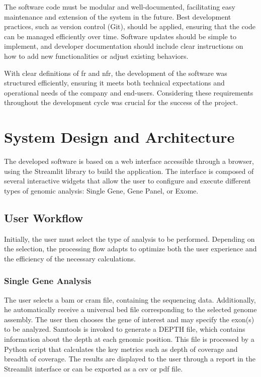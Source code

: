 The software code must be modular and well-documented, facilitating easy maintenance and extension of the system in the future. Best development practices, such as version control (Git), should be applied, ensuring that the code can be managed efficiently over time. Software updates should be simple to implement, and developer documentation should include clear instructions on how to add new functionalities or adjust existing behaviors.

With clear definitions of \ac{fr} and \ac{nfr}, the development of the software was structured efficiently, ensuring it meets both technical expectations and operational needs of the company and end-users. Considering these requirements throughout the development cycle was crucial for the success of the project.

\section{System Design and Architecture}

The developed software is based on a web interface accessible through a browser, using the Streamlit library to build the application. The interface is composed of several interactive widgets that allow the user to configure and execute different types of genomic analysis: Single Gene, Gene Panel, or Exome.

\subsection{User Workflow}

Initially, the user must select the type of analysis to be performed. Depending on the selection, the processing flow adapts to optimize both the user experience and the efficiency of the necessary calculations.

\subsubsection{\textbf{Single Gene Analysis}}

The user selects a \ac{bam} or \ac{cram} file, containing the sequencing data. Additionally, he automatically receive a universal \ac{bed} file corresponding to the selected genome assembly. The user then chooses the gene of interest and may specify the exon(s) to be analyzed. Samtools is invoked to generate a DEPTH file, which contains information about the depth at each genomic position. This file is processed by a Python script that calculates the key metrics such as depth of coverage and breadth of coverage. The results are displayed to the user through a report in the Streamlit interface or can be exported as a \ac{csv} or \ac{pdf} file.

